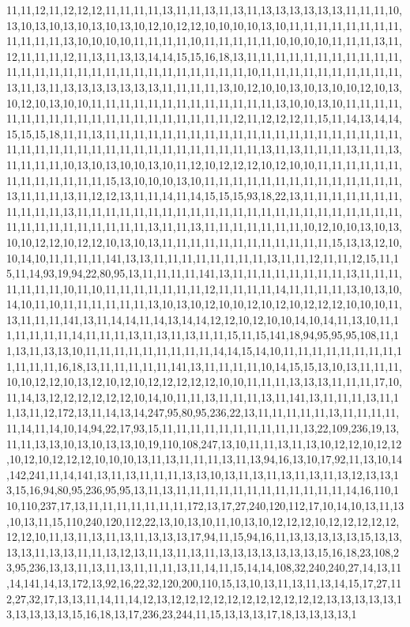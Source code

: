 11,11,12,11,12,12,12,11,11,11,11,13,11,11,13,11,13,11,13,13,13,13,13,13,11,11,11,10,13,10,13,10,13,10,13,10,13,10,12,10,12,12,10,10,10,10,13,10,11,11,11,11,11,11,11,11,11,11,11,11,13,10,10,10,10,11,11,11,11,10,11,11,11,11,11,10,10,10,10,11,11,11,13,11,12,11,11,11,12,11,13,11,13,13,14,14,15,15,16,18,13,11,11,11,11,11,11,11,11,11,11,11,11,11,11,11,11,11,11,11,11,11,11,11,11,11,11,11,11,10,11,11,11,11,11,11,11,11,11,11,13,11,13,11,13,13,13,13,13,13,13,11,11,11,11,13,10,12,10,10,13,10,13,10,10,12,10,13,10,12,10,13,10,10,11,11,11,11,11,11,11,11,11,11,11,11,11,13,10,10,13,10,11,11,11,11,11,11,11,11,11,11,11,11,11,11,11,11,11,11,11,11,12,11,12,12,12,11,15,11,14,13,14,14,15,15,15,18,11,11,13,11,11,11,11,11,11,11,11,11,11,11,11,11,11,11,11,11,11,11,11,11,11,11,11,11,11,11,11,11,11,11,11,11,11,11,11,11,11,11,13,11,13,11,11,11,13,11,11,13,11,11,11,11,10,13,10,13,10,10,13,10,11,12,10,12,12,12,10,12,10,10,11,11,11,11,11,11,11,11,11,11,11,11,11,15,13,10,10,10,13,10,11,11,11,11,11,11,11,11,11,11,11,11,11,11,13,11,11,11,13,11,12,12,13,11,11,14,11,14,15,15,15,93,18,22,13,11,11,11,11,11,11,11,11,11,11,11,13,11,11,11,11,11,11,11,11,11,11,11,11,11,11,11,11,11,11,11,11,11,11,11,11,11,11,11,11,11,11,11,11,11,13,11,11,13,11,11,11,11,11,11,11,10,12,10,10,13,10,13,10,10,12,12,10,12,12,10,13,10,13,11,11,11,11,11,11,11,11,11,11,11,11,15,13,13,12,10,10,14,10,11,11,11,11,141,13,13,11,11,11,11,11,11,11,11,13,11,11,12,11,11,12,15,11,15,11,14,93,19,94,22,80,95,13,11,11,11,11,141,13,11,11,11,11,11,11,11,11,13,11,11,11,11,11,11,11,10,11,10,11,11,11,11,11,11,11,12,11,11,11,11,14,11,11,11,11,13,10,13,10,14,10,11,10,11,11,11,11,11,11,13,10,13,10,12,10,10,12,10,12,10,12,12,12,10,10,10,11,13,11,11,11,141,13,11,14,14,11,14,13,14,14,12,12,10,12,10,10,14,10,14,11,13,10,11,11,11,11,11,11,14,11,11,11,13,11,13,11,13,11,11,15,11,15,141,18,94,95,95,95,108,11,11,13,11,13,13,10,11,11,11,11,11,11,11,11,11,14,14,15,14,10,11,11,11,11,11,11,11,11,11,11,11,11,16,18,13,11,11,11,11,11,141,13,11,11,11,11,10,14,15,15,13,10,13,11,11,11,10,10,12,12,10,13,12,10,12,10,12,12,12,12,12,10,10,11,11,11,13,13,13,11,11,11,17,10,11,14,13,12,12,12,12,12,12,10,14,10,11,11,13,11,11,11,13,11,141,13,11,11,11,13,11,11,13,11,12,172,13,11,14,13,14,247,95,80,95,236,22,13,11,11,11,11,11,13,11,11,11,11,11,14,11,14,10,14,94,22,17,93,15,11,11,11,11,11,11,11,11,11,11,13,22,109,236,19,13,11,11,13,13,10,13,10,13,13,10,19,110,108,247,13,10,11,11,13,11,13,10,12,12,10,12,12,10,12,10,12,12,12,10,10,10,13,11,13,11,11,11,13,11,13,94,16,13,10,17,92,11,13,10,14,142,241,11,14,141,13,11,13,11,11,11,13,13,10,13,11,13,11,13,11,13,11,13,12,13,13,13,15,16,94,80,95,236,95,95,13,11,13,11,11,11,11,11,11,11,11,11,11,11,11,14,16,110,110,110,237,17,13,11,11,11,11,11,11,11,172,13,17,27,240,120,112,17,10,14,10,13,11,13,10,13,11,15,110,240,120,112,22,13,10,13,10,11,10,13,10,12,12,12,10,12,12,12,12,12,12,12,10,11,13,11,13,11,13,11,13,13,13,17,94,11,15,94,16,11,13,13,13,13,13,15,13,13,13,13,11,13,13,11,11,13,12,13,11,13,11,13,11,13,13,13,13,13,13,13,15,16,18,23,108,23,95,236,13,13,11,13,11,13,11,11,11,13,11,14,11,15,14,14,108,32,240,240,27,14,13,11,14,141,14,13,172,13,92,16,22,32,120,200,110,15,13,10,13,11,13,11,13,14,15,17,27,112,27,32,17,13,13,11,14,11,14,12,13,12,12,12,12,12,12,12,12,12,12,12,13,13,13,13,13,13,13,13,13,13,15,16,18,13,17,236,23,244,11,15,13,13,13,17,18,13,13,13,13,1